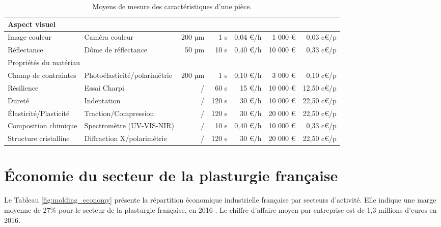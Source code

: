\begin{table}[h!]
\begin{tabular}{|l|l|r|r|r|r|r|}
		\hline
		\multicolumn{7}{|l|}{Aspect visuel} \\ \hline
		Image couleur & Caméra couleur & 200 µm & 1 s & 0,04 €/h & 1 000 € & 0,03 c€/p \\ \hline
		Réflectance & Dôme de réflectance & 50 µm & 10 s & 0,40 €/h & 10 000 € & 0,33 c€/p \\ \hline
		\hline
		\multicolumn{7}{|l|}{Propriétés du matériau} \\ \hline
		Champ de contraintes & Photoélasticité/polarimétrie & 200 µm & 1 s & 0,10 €/h & 3 000 € & 0,10 c€/p \\ \hline
		Résilience & Essai Charpi & / & 60 s & 15 €/h & 10 000 € & 12,50 c€/p \\ \hline
		Dureté & Indentation & / & 120 s & 30 €/h & 10 000 € & 22,50 c€/p \\ \hline
		Élasticité/Plasticité & Traction/Compression & / & 120 s & 30 €/h & 20 000 € & 22,50 c€/p \\ \hline
		Composition chimique & Spectromètre (UV-VIS-NIR) & / & 10 s & 0,40 €/h & 10 000 € & 0,33 c€/p \\ \hline
		Structure cristalline & Diffraction X/polarimétrie & / & 120 s & 30 €/h & 20 000 € & 22,50 c€/p \\ \hline
	\end{tabular}
	\caption{Moyens de mesure des caractéristiques d'une pièce.}
	\label{tab:product_measurements}
\end{table}


\FloatBarrier
\chapter{Économie du secteur de la plasturgie française}
\label{Ann:2}

Le Tableau \ref{fig:molding_economy} présente la répartition économique industrielle française par secteurs d'activité.
Elle indique une marge moyenne de 27\% pour le secteur de la plasturgie française, en 2016 \cite{directiongeneraledesentreprises_chiffres_2019}.
Le chiffre d'affaire moyen par entreprise est de 1,3 millions d'euros en 2016.

